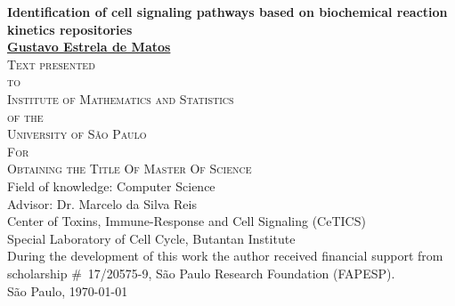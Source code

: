 \documentclass[12pt, twoside]{report}
\numberwithin{mydefinition}{section}
\numberwithin{mytheorem}{section}
\numberwithin{mylemma}{section}
\numberwithin{corollary}{section}
\begin{document}

\thispagestyle{empty}
\begin{center}
{\Large
{\bf Identification of cell signaling pathways based on biochemical 
    reaction kinetics repositories}\\
\bigskip
\bigskip
\bigskip
\bigskip
    {\bf \href{mailto:gustavo.estrela.matos@gmail.com}{Gustavo Estrela de Matos}}\\
\bigskip
\bigskip
\bigskip
\bigskip
\textsc{
    Text presented\\[-0.25cm] 
    to\\[-0.25cm]
    Institute of Mathematics and Statistics\\[-0.25cm]
    of the\\[-0.25cm]
    University of São Paulo\\[-0.25cm]
    For\\[-0.25cm]
    Obtaining the Title Of Master Of Science\\
    }
\bigskip
\bigskip
\bigskip
\bigskip
Field of knowledge: Computer Science\\
\bigskip
Advisor: Dr. Marcelo da Silva Reis\\
\bigskip
\bigskip
\bigskip
\bigskip
\bigskip
\bigskip
\bigskip
\bigskip
Center of Toxins, Immune-Response and Cell Signaling (CeTICS)\\
\bigskip
Special Laboratory of Cell Cycle, Butantan Institute\\
\bigskip
\bigskip
{\normalsize During the development of this work the author received 
    financial support from scholarship \#~17/20575-9, São Paulo Research Foundation (FAPESP).}\\
\bigskip
\bigskip
\bigskip
São Paulo, \today
}
\end{center}
\newpage
\end{document}
